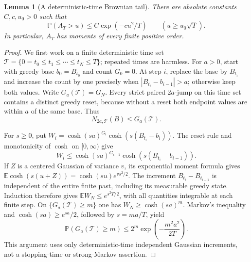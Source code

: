 \documentclass[11pt]{article}
\numberwithin{equation}{section}
\newtheorem{lemma}[theorem]{Lemma}
\theoremstyle{remark}
\theoremstyle{definition}
\begin{document}
\begin{lemma}[A deterministic-time Brownian tail]
\label{mod:brownian-deterministic}
There are absolute constants $C,c,u_0>0$ such that
\begin{equation}\label{mod:brownian-deterministic-tail}
 \mathbb P(A_T>u)\le C\exp(-cu^2/T)
 \qquad (u\ge u_0\sqrt T).
\end{equation}
In particular, $A_T$ has moments of every finite positive order.
\end{lemma}

\begin{proof}
We first work on a finite deterministic time set
$\mathcal T=\{0=t_0\le t_1\le\cdots\le t_N\le T\}$; repeated times
are harmless.  For $a>0$, start with greedy base $b_0=B_{t_0}$ and
count $G_0=0$.  At step $i$, replace the base by $B_{t_i}$ and increase
the count by one precisely when $|B_{t_i}-b_{i-1}|>a$; otherwise keep
both values.  Write $G_a(\mathcal T)=G_N$.
Every strict paired $2a$-jump on this time set contains a distinct
greedy reset, because without a reset both endpoint values are within
$a$ of the same base.  Thus
\begin{equation}\label{mod:greedy-count}
 N_{2a,\mathcal T}(B)\le G_a(\mathcal T).
\end{equation}

For $s\ge0$, put
$W_i=\cosh(sa)^{G_i}\cosh(s(B_{t_i}-b_i))$.
The reset rule and monotonicity of $\cosh$ on $[0,\infty)$ give
\[
 W_i\le\cosh(sa)^{G_{i-1}}
             \cosh(s(B_{t_i}-b_{i-1})).
\]
If $Z$ is a centered Gaussian of variance $v$, its exponential moment
formula gives
$\mathbb E\cosh(s(u+Z))=\cosh(su)e^{vs^2/2}$.
The increment $B_{t_i}-B_{t_{i-1}}$ is independent of the entire finite
past, including its measurable greedy state.  Induction therefore gives
$\mathbb E W_N\le e^{s^2T/2}$, with all quantities integrable at each
finite step.  On $\{G_a(\mathcal T)\ge m\}$ one has
$W_N\ge\cosh(sa)^m$.  Markov's inequality and
$\cosh(sa)\ge e^{sa}/2$, followed by $s=ma/T$, yield
\begin{equation}\label{mod:greedy-tail}
 \mathbb P(G_a(\mathcal T)\ge m)
 \le2^m\exp\!\left(-\frac{m^2a^2}{2T}\right).
\end{equation}
This argument uses only deterministic-time independent Gaussian
increments, not a stopping-time or strong-Markov assertion.


\end{proof}
\end{document}

